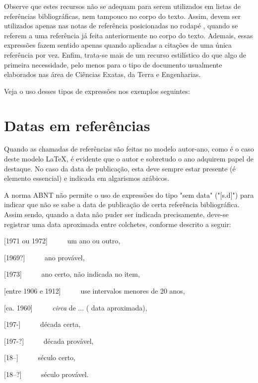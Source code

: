 \begin{apendicesenv}
Observe que estes recursos não se adequam para serem utilizados em listas de referências bibliográficas, nem tampouco no corpo do texto. Assim, devem ser utilizados apenas nas notas de referência posicionadas no rodapé \cite[p.~6]{abnTeX22014c}, quando se referem a uma referência já feita anteriormente no corpo do texto. Ademais, essas expressões fazem sentido apenas quando aplicadas a citações de uma única referência por vez. Enfim, trata-se mais de um recurso estilístico do que algo de primeira necessidade, pelo menos para o tipo de documento usualmente elaborados nas área de Ciências Exatas, da Terra e Engenharias.

Veja o uso desses tipos de expressões nos exemplos seguintes:







\section{Datas em referências}
\label{sec:datasBib}

Quando as chamadas de referências são feitas no modelo autor-ano, como é o caso deste modelo \LaTeX{}, é evidente que o autor e sobretudo o ano adquirem papel de destaque. No caso da data de publicação, esta deve sempre estar presente (é elemento essencial) e indicada em algarismos arábicos.

A norma ABNT não permite o uso de expressões do tipo "sem data"{} ("[s.d]") para indicar que não se sabe a data de publicação de certa referência bibliográfica. Assim sendo, quando a data não puder ser indicada precisamente, deve-se registrar uma data aproximada entre colchetes, conforme descrito a seguir:

[1971 ou 1972] \ \ \ \ \ um ano ou outro,

[1969?] \ \ \ \ \ ano provável,

[1973] \ \ \ \ \ ano certo, não indicada no item,

[entre 1906 e 1912] \ \ \ \ \ use intervalos menores de 20 anos,

[ca. 1960] \ \ \ \ \ \textit{circa} de ... ( data aproximada),

[197-] \ \ \ \ \ década certa,

[197-?] \ \ \ \ \ década provável,

[18--] \ \ \ \ \ século certo,

[18--?] \ \ \ \ \ século provável.

\end{apendicesenv}
